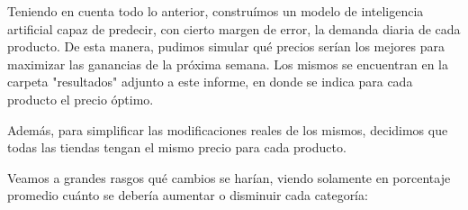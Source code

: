 \documentclass[12pt,a4paper]{article}
\begin{document}
\begin{center}
\end{center}


Teniendo en cuenta todo lo anterior, construímos un modelo de inteligencia artificial capaz de predecir, con cierto margen 
de error, la demanda diaria de cada producto. De esta manera, pudimos simular qué precios serían los mejores para maximizar las ganancias de la próxima semana. 
Los mismos se encuentran en la carpeta "resultados" adjunto a este informe, en donde se indica para cada producto el precio óptimo. 

Además, para simplificar las modificaciones reales de los mismos, decidimos que todas las tiendas 
tengan el mismo precio para cada producto.

\vspace{0.2cm}

Veamos a grandes rasgos qué cambios se harían, viendo solamente en porcentaje promedio cuánto se debería 
aumentar o disminuir cada categoría:
\begin{center}
\end{center}
\end{document}
